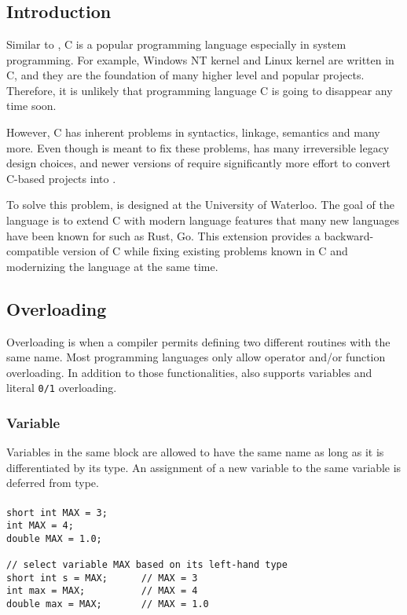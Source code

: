\chapter{\CFA} \label{CFA}
\section{Introduction}
Similar to \CC, C is a popular programming language especially in system
programming. For example, Windows NT kernel and Linux kernel are written in C, and they are the foundation of many higher level
and popular projects. Therefore, it is unlikely that programming language C is
going to disappear any time soon.

However, C has inherent problems in syntactics, linkage, semantics and many
more. Even though \CCS is meant to fix these problems, \CCS has many
irreversible legacy design choices, and newer versions of \CCS require significantly more effort to convert C-based projects into \CCS.

To solve this problem, \CFAS is designed at the University of Waterloo. The goal
of the language is to extend C with modern language features that many new
languages have been known for such as Rust, Go. This extension provides a
backward-compatible version of C while fixing existing problems known in C and
modernizing the language at the same time.

\section{Overloading}
Overloading is when a compiler permits defining two different routines with
the same name. Most programming languages only allow operator and/or function overloading.
In addition to those functionalities, \CFAS also supports variables and literal
\verb|0/1| overloading.

\subsection{Variable}
Variables in the same block are allowed to have the same name as long as it is
differentiated by its type. An assignment of a new variable to the same variable is
deferred from type.
\begin{frame}
\frametitle{}
\begin{lstlisting}
short int MAX = 3;
int MAX = 4;
double MAX = 1.0;

// select variable MAX based on its left-hand type
short int s = MAX;      // MAX = 3
int max = MAX;          // MAX = 4
double max = MAX;       // MAX = 1.0
\end{lstlisting}
\end{frame}


